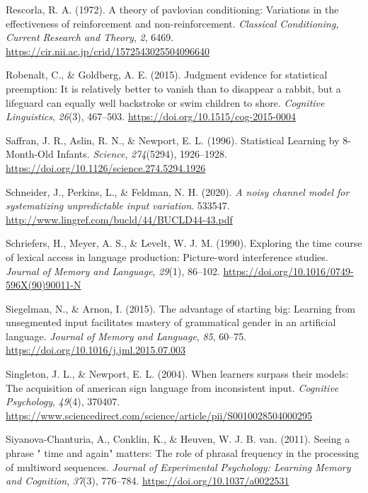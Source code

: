 \documentclass[
  12pt,
  letterpaper,
]{scrreprt}
\newlength{\cslhangindent}
\newenvironment{CSLReferences}[2] %
 {\begin{list}{}{%
  \setlength{\itemindent}{0pt}
  \setlength{\leftmargin}{0pt}
  \setlength{\parsep}{0pt}
  \ifodd #1
   \setlength{\leftmargin}{\cslhangindent}
   \setlength{\itemindent}{-1\cslhangindent}
  \fi
  \setlength{\itemsep}{#2\baselineskip}}}
 {\end{list}}
\begin{document}
\begin{CSLReferences}{1}{0}
Rescorla, R. A. (1972). A theory of pavlovian conditioning: Variations
in the effectiveness of reinforcement and non-reinforcement.
\emph{Classical Conditioning, Current Research and Theory}, \emph{2},
6469. \url{https://cir.nii.ac.jp/crid/1572543025504096640}

Robenalt, C., \& Goldberg, A. E. (2015). Judgment evidence for
statistical preemption: It is relatively better to vanish than to
disappear a rabbit, but a lifeguard can equally well backstroke or swim
children to shore. \emph{Cognitive Linguistics}, \emph{26}(3), 467--503.
\url{https://doi.org/10.1515/cog-2015-0004}

Saffran, J. R., Aslin, R. N., \& Newport, E. L. (1996). Statistical
Learning by 8-Month-Old Infants. \emph{Science}, \emph{274}(5294),
1926--1928. \url{https://doi.org/10.1126/science.274.5294.1926}

Schneider, J., Perkins, L., \& Feldman, N. H. (2020). \emph{A noisy
channel model for systematizing unpredictable input variation}. 533547.
\url{http://www.lingref.com/bucld/44/BUCLD44-43.pdf}

Schriefers, H., Meyer, A. S., \& Levelt, W. J. M. (1990). Exploring the
time course of lexical access in language production: Picture-word
interference studies. \emph{Journal of Memory and Language},
\emph{29}(1), 86--102.
\url{https://doi.org/10.1016/0749-596X(90)90011-N}

Siegelman, N., \& Arnon, I. (2015). The advantage of starting big:
Learning from unsegmented input facilitates mastery of grammatical
gender in an artificial language. \emph{Journal of Memory and Language},
\emph{85}, 60--75. \url{https://doi.org/10.1016/j.jml.2015.07.003}

Singleton, J. L., \& Newport, E. L. (2004). When learners surpass their
models: The acquisition of american sign language from inconsistent
input. \emph{Cognitive Psychology}, \emph{49}(4), 370407.
\url{https://www.sciencedirect.com/science/article/pii/S0010028504000295}

Siyanova-Chanturia, A., Conklin, K., \& Heuven, W. J. B. van. (2011).
Seeing a phrase {"} time and again{"} matters: The role of phrasal
frequency in the processing of multiword sequences. \emph{Journal of
Experimental Psychology: Learning Memory and Cognition}, \emph{37}(3),
776--784. \url{https://doi.org/10.1037/a0022531}


\end{CSLReferences}
\end{document}
